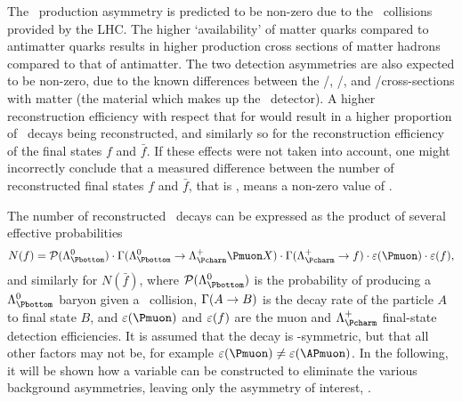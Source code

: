 The \PLambdab\ production asymmetry is predicted to be non-zero due to the \pp\ 
collisions provided by the \ac{LHC}.
The higher `availability' of matter quarks compared to antimatter quarks 
results in higher production cross sections of matter hadrons compared to that 
of antimatter.
The two detection asymmetries are also expected to be non-zero, due to the 
known differences between the \PKminus/\PKplus, \Ppiminus/\Ppiplus, and 
\Pproton/\APproton cross-sections with matter (the material which makes up the 
\lhcb\ detector).
A higher \Pmuon reconstruction efficiency with respect that for \APmuon would 
result in a higher proportion of \PLambdac\ decays being reconstructed, and 
similarly so for the reconstruction efficiency of the final states $f$ and 
$\bar{f}$.
If these effects were not taken into account, one might incorrectly conclude 
that a measured difference between the number of reconstructed final states $f$ 
and $\bar{f}$, that is \ARaw, means a non-zero value of \ACP\@.

The number of reconstructed \LcTof\ decays can be expressed as the product of 
several effective probabilities
\begin{equation}
  N(f) = \prob(\PLambdab)\cdot
         \Gamma(\LbToLcmuX)\cdot
         \Gamma(\LcTof)\cdot
         \eff(\Pmuon)\cdot
         \eff(f),
  \label{eqn:cpv:theory:yield}
\end{equation}
and similarly for $N(\bar{f})$, where $\prob(\PLambdab)$ is the probability of 
producing a $\PLambdab$ baryon given a \pp\ collision, $\Gamma(A \to B)$ 
is the decay rate of the particle $A$ to final state $B$, and $\eff(\Pmuon)$ 
and $\varepsilon(f)$ are the muon and $\PLambdac$ final-state detection efficiencies.
It is assumed that the \LbToLcmuX decay is \CP-symmetric, but that all other 
factors may not be, for example $\eff(\Pmuon) \neq \eff(\APmuon)$.
In the following, it will be shown how a variable can be constructed to 
eliminate the various background asymmetries, leaving only the asymmetry of 
interest, \ACP\@.

